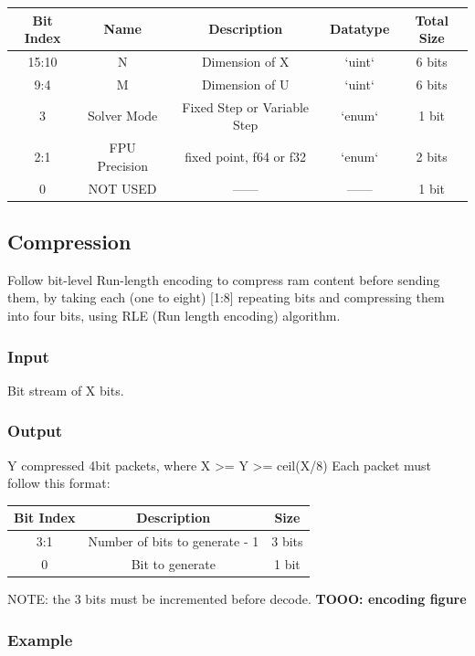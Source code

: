 \documentclass[12pt]{extarticle}
\begin{document}
\begin{center}
 \begin{tabular}{||c c c c c||} 
 \hline
 Bit Index & Name & Description & Datatype & Total Size \\ [0.5ex] 
 \hline\hline
  15:10 & N & Dimension of X  & `uint` & 6 bits  \\ 
 \hline
 9:4 & M & Dimension of U  & `uint` & 6 bits  \\ 
 \hline
 3 & Solver Mode & Fixed Step or Variable Step  & `enum` & 1 bit \\ 
 \hline
 2:1 & FPU Precision & fixed point, f64 or f32 & `enum` & 2 bits  \\ 
 \hline
 0  & NOT USED &  ------ & ------ & 1 bit \\ [1ex] 
 \hline
\end{tabular}
\end{center}

\subsection{Compression}
Follow bit-level Run-length encoding to compress ram content before sending them, by taking each (one to eight) [1:8] repeating bits and compressing them into four bits, using RLE (Run length encoding) algorithm.

\subsubsection{Input}
Bit stream of X bits.

\subsubsection{Output}
Y compressed 4bit packets, where X >= Y >= ceil(X/8)
Each packet must follow this format:

\begin{center}
 \begin{tabular}{||c c c||} 
 \hline
 Bit Index & Description & Size \\ [0.5ex] 
 \hline\hline
  3:1 & Number of bits to generate - 1 & 3 bits  \\ 
 \hline
 0  & Bit to generate &  1 bit \\ [1ex] 
 \hline
\end{tabular}
\end{center}
NOTE: the 3 bits must be incremented before decode.
\textbf{TOOO: encoding figure}

\subsubsection{Example}
\end{document}
